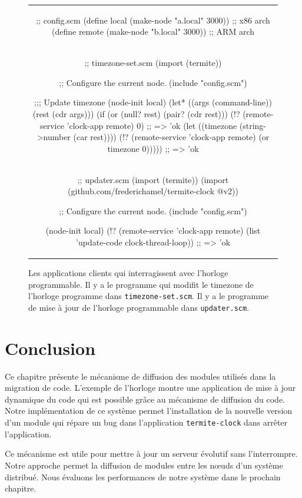 \begin{figure}[ht]
  \centering\fontsize{8}{7}
  \begin{tabular}{c}
\begin{mplisting}{0.75}
;; config.scm
(define local    (make-node "a.local" 3000)) ;; x86 arch
(define remote   (make-node "b.local" 3000)) ;; ARM arch
\end{mplisting}\\

\begin{mplisting}{0.75}
;; timezone-set.scm
(import (termite))

;; Configure the current node.
(include "config.scm")

;;; Update timezone
(node-init local)
(let* ((args (command-line))
       (rest (cdr args)))
  (if (or (null? rest)
          (pair? (cdr rest)))
      (!? (remote-service 'clock-app remote) 0) ;; => 'ok
      (let ((timezone (string->number (car rest))))
        (!? (remote-service 'clock-app remote) (or timezone 0))))) ;; => 'ok
\end{mplisting}\\

\begin{mplisting}{0.75}
;; updater.scm
(import (termite))
(import (github.com/frederichamel/termite-clock @v2))

;; Configure the current node.
(include "config.scm")

(node-init local)
(!? (remote-service 'clock-app remote)
    (list 'update-code clock-thread-loop)) ;; => 'ok
\end{mplisting}
  \end{tabular}
  \caption{Les applications clients qui interragissent avec
    l'horloge programmable. Il y a le programme qui modifit
    le timezone de l'horloge programme dans \texttt{timezone-set.scm}.
    Il y a le programme de mise à jour de l'horloge programmable
    dans \texttt{updater.scm}.}
  \vspace*{4ex}
  \label{fig:termite_clock_client}
\end{figure}

\section{Conclusion}
Ce chapitre présente le mécanisme de diffusion des modules utilisés
dans la migration de code. L'exemple de l'horloge montre une application
de mise à jour dynamique du code qui est possible grâce au mécanisme
de diffusion du code. Notre implémentation de ce système permet l'installation
de la nouvelle version d'un module qui répare un bug dans l'application
\texttt{termite-clock} dans arrêter l'application.

Ce mécanisme est utile pour mettre à jour un serveur évolutif sans
l'interrompre. Notre approche permet la diffusion de modules entre les nœuds
d'un système distribué. Nous évaluons les performances de notre
système dans le prochain chapitre.
